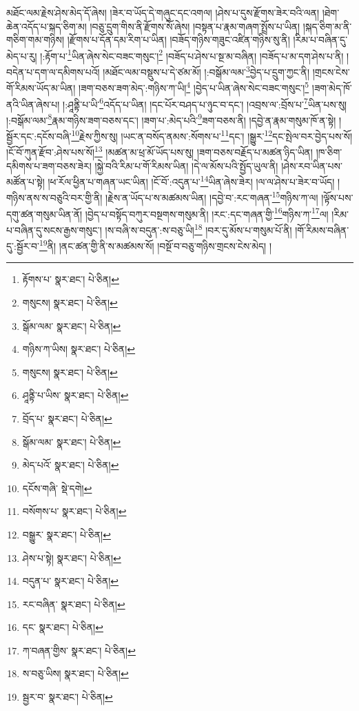 མཐོང་ལམ་རྗེས་ཤེས་མེད་དོ་ཞེས། །ཟེར་བ་ཡོད་དེ་གཞུང་དང་འགལ། །ཤེས་པ་དུས་རྫོགས་ཟེར་བའི་ལན། །ཐེག་ཆེན་འདོད་པ་སྐད་ཅིག་མ། །བཅུ་དྲུག་གིས་ནི་རྫོགས་སོ་ཞེས། །བསྟན་པ་རྣམ་གཞག་སྤྲོས་པ་ཡིན། །སྐད་ཅིག་མ་ནི་གཅིག་གམ་གཉིས། །རྫོགས་པ་དོན་དམ་རིག་པ་ཡིན། །བཟོད་གཉིས་གཟུང་འཛིན་གཉིས་སུ་ནི། །རིམ་པ་བཞིན་དུ་མེད་པ་རུ། །:རྟོག་པ་\footnote{རྟོགས་པ་  སྣར་ཐང་།  པེ་ཅིན། }ཡིན་ཞེས་སེང་བཟང་གསུང་།\footnote{གསུངས།  སྣར་ཐང་།  པེ་ཅིན། } །བཟོད་པ་ཤེས་པ་སྔ་མ་བཞིན། །བཟོད་པ་མ་དག་ཤེས་པ་ནི། །བདེན་པ་དག་ལ་དམིགས་པའོ། །མཐོང་ལམ་བསྡུས་པ་དེ་ཙམ་མོ། །:བསྒོམ་ལམ་\footnote{སྒོམ་ལམ་  སྣར་ཐང་།  པེ་ཅིན། }བྱེད་པ་དྲུག་ཀྱང་ནི། །གྲངས་ངེས་གོ་རིམས་ཡོད་མ་ཡིན། །ཟག་བཅས་ཟག་མེད་:གཉིས་ཀ་ཡི།\footnote{གཉིས་ཀ་ཡིས།  སྣར་ཐང་།  པེ་ཅིན། } །བྱེད་པ་ཡིན་ཞེས་སེང་བཟང་གསུང་།\footnote{གསུངས།  སྣར་ཐང་།  པེ་ཅིན། } །ཟག་མེད་ཁོ་ནའི་ཡིན་ཞེས་པ། །:ཤཱནྟི་པ་ཡི་\footnote{ཤཱནྟི་པ་ཡིས་  སྣར་ཐང་།  པེ་ཅིན། }འདོད་པ་ཡིན། །དང་པོར་བཤད་པ་ཉུང་བ་དང་། །འབྲས་ལ་:བྲོས་པ་\footnote{བྲོད་པ་  སྣར་ཐང་།  པེ་ཅིན། }ཡིན་པས་སུ། །:བསྒོམ་ལམ་\footnote{སྒོམ་ལམ་  སྣར་ཐང་།  པེ་ཅིན། }རྣམ་གཉིས་ཟག་བཅས་དང་། །ཟག་པ་:མེད་པའི་\footnote{མེད་པའོ་  སྣར་ཐང་།  པེ་ཅིན། }ཟག་བཅས་ནི། །དབྱེ་ན་རྣམ་གསུམ་ཁོ་ན་སྟེ། །སྦྱོར་དང་:དངོས་བཞི་\footnote{དངོས་གཞི་  སྡེ་དགེ། }རྗེས་ཀྱིས་སུ། །ཡང་ན་བསོད་ནམས་:སོགས་པ་\footnote{བསོགས་པ་  སྣར་ཐང་།  པེ་ཅིན། }དང་། །སྒྱུར་\footnote{བསྒྱུར་  སྣར་ཐང་།  པེ་ཅིན། }དང་སྤེལ་བར་བྱེད་པས་སོ། །ངོ་བོ་ཀུན་རྫོབ་:ཤེས་པས་སོ།\footnote{ཤེས་པ་སྟེ།  སྣར་ཐང་།  པེ་ཅིན། } །མཚན་མ་ཕྲ་མོ་ཡོད་པས་སུ། །ཟག་བཅས་བརྗོད་པ་མཚན་ཉིད་ཡིན། །ཁ་ཅིག་དམིགས་པ་ཟག་བཅས་ཟེར། །སྐྱེ་བའི་རིམ་པ་གོ་རིམས་ཡིན། །དེ་ལ་མོས་པའི་སྤྱོད་ཡུལ་ནི། །ཤེས་རབ་ཡིན་པས་མཚོན་པ་སྟེ། །ཕ་རོལ་ཕྱིན་པ་གཞན་ཡང་ཡིན། །ངོ་བོ་:འདུན་པ་\footnote{བདུན་པ་  སྣར་ཐང་།  པེ་ཅིན། }ཡིན་ཞེས་ཟེར། །ལ་ལ་ཤེས་པ་ཟེར་བ་ཡོད། །གཉིས་ནས་ས་བཅུའི་བར་གྱི་ནི། །རྗེས་ན་ཡོད་པ་ས་མཚམས་ཡིན། །དབྱེ་བ་:རང་གཞན་\footnote{རང་བཞིན་  སྣར་ཐང་།  པེ་ཅིན། }གཉིས་ཀ་ལ། །ལྟོས་པས་དགུ་ཚན་གསུམ་ཡིན་ནོ། །བྱེད་པ་བསྟོད་བཀུར་བསྔགས་གསུམ་ནི། །རང་:དང་གཞན་གྱི་\footnote{དང་  སྣར་ཐང་།  པེ་ཅིན། }གཉིས་ཀ་\footnote{ཀ་བཞན་གྱིས་  སྣར་ཐང་།  པེ་ཅིན། }ལ། །རིམ་པ་བཞིན་དུ་སངས་རྒྱས་གསུང་། །ས་བཞི་ས་བདུན་:ས་བཅུ་ཡི།\footnote{ས་བཅུ་ཡིས།  སྣར་ཐང་།  པེ་ཅིན། } །བར་དུ་མོས་པ་གསུམ་པོ་ནི། །གོ་རིམས་བཞིན་དུ་:སྦྱོར་བ་\footnote{སྦྱར་བ་  སྣར་ཐང་།  པེ་ཅིན། }ནི། །ནང་ཚན་གྱི་ནི་ས་མཚམས་སོ། །བསྔོ་བ་བཅུ་གཉིས་གྲངས་ངེས་མེད། །

